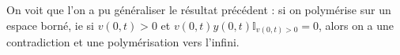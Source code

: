 \documentclass[a4paper]{article}
\theoremstyle{definition}
\theoremstyle{remark}
\begin{document}
On voit que l'on a pu généraliser le résultat précédent : si on polymérise sur un espace borné, 
ie si $v(0,t) >0$ et $ v(0,t)y(0,t)\mathbb{I}_{v(0,t)>0} =0$,
 alors on a une contradiction et une polymérisation vers l'infini.
			 


\medskip


	
\end{document}
